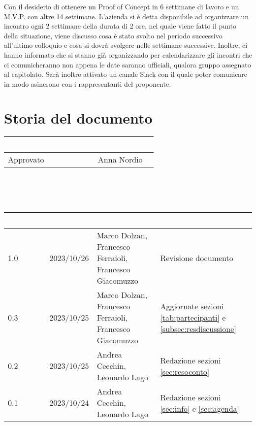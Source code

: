 \documentclass[12pt]{article}
\begin{document}
\begin{enumerate}
Con il desiderio di ottenere un Proof of Concept in 6 settimane di lavoro e un M.V.P. con altre 14 settimane. L'azienda si è detta disponibile ad organizzare un incontro ogni 2 settimane della durata di 2 ore, nel quale viene fatto il punto della situazione, viene discusso cosa è stato svolto nel periodo successivo all'ultimo colloquio e cosa si dovrà svolgere nelle settimane successive. Inoltre, ci hanno informato che si stanno già organizzando per calendarizzare gli incontri che ci comunicheranno non appena le date saranno ufficiali, qualora gruppo assegnato al capitolato.
Sarà inoltre attivato un canale Slack con il quale poter comunicare in modo asincrono con i rappresentanti del proponente.
    
\end{enumerate}

\section{Storia del documento} \label{sec:storia}
\begingroup
\setlength{\tabcolsep}{10pt}
\renewcommand{\arraystretch}{1.5}
\begin{tabularx}{\textwidth}{| X | X |}
    \hline
    \rowcolor{headerrow} \textbf{\textcolor{white}{Stato del documento}} & \textbf{\textcolor{white}{Responsabile}} \\
    \hline
    Approvato & Anna Nordio\\
    \hline   
\end{tabularx}
\\\\\\
\begin{tabularx}{\textwidth}{| l | l | X | X |}
    \hline
    \rowcolor{headerrow} \textbf{\textcolor{white}{Versione}} & \textbf{\textcolor{white}{Data}} & \textbf{\textcolor{white}{Autori}} & \textbf{\textcolor{white}{Descrizione}} \\
    \hline
    1.0 & 2023/10/26 & Marco Dolzan, Francesco Ferraioli, Francesco Giacomuzzo & Revisione documento\\
    \hline
    0.3 & 2023/10/25 &Marco Dolzan, Francesco Ferraioli, Francesco Giacomuzzo & Aggiornate sezioni \ref{tab:partecipanti} e \ref{subsec:resdiscussione} \\
    \hline
    0.2 & 2023/10/25 & Andrea Cecchin, Leonardo Lago & Redazione sezioni \ref{sec:resoconto} \\
    \hline
    0.1 & 2023/10/24 & Andrea Cecchin, Leonardo Lago  & Redazione sezioni \ref{sec:info} e \ref{sec:agenda}\\
    \hline   
\end{tabularx}
\endgroup
\end{document}
